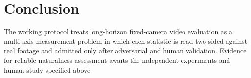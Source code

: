 \section{Conclusion}
The working protocol treats long-horizon fixed-camera video evaluation as a multi-axis measurement problem in which each statistic is read two-sided against real footage and admitted only after adversarial and human validation. Evidence for reliable naturalness assessment awaits the independent experiments and human study specified above.
